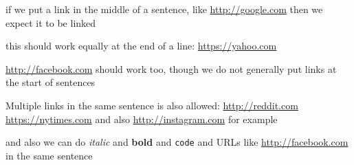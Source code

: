 
if we put a link in the middle of a sentence, like \url{http://google.com} then we expect it to be linked

this should work equally at the end of a line: \url{https://yahoo.com}

\url{http://facebook.com} should work too, though we do not generally put links at the start of sentences

Multiple links in the same sentence is also allowed: \url{http://reddit.com} \url{https://nytimes.com} and also \url{http://instagram.com} for example

and also we can do \emph{italic} and \textbf{bold} and \verb|code| and URLs like \url{http://facebook.com} in the same sentence

